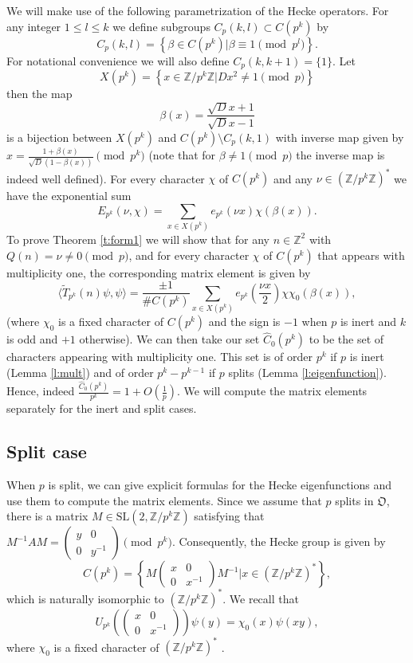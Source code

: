 \documentclass[12pt]{amsart}
\theoremstyle{definition}
\theoremstyle{remark}
\numberwithin{equation}{section}
\newcommand{\set}[1]{\left\{#1\right\}}
\newcommand{\T}[1]{\tilde{T}_{#1}}
\newcommand{\frakO}{\mathfrak{O}}
\newcommand{\bbZ}{\mathbb{Z}}
\newcommand{\SL}{ \mathrm{SL}}
\begin{document}
We will make use of the following parametrization of the Hecke
operators. For any integer $1\leq l\leq k$ we define subgroups
$C_p(k,l)\subset C(p^k)$ by
\[C_p(k,l)=\set{\beta\in C(p^k)|\beta\equiv 1\pmod {p^l}}.\]
For notational convenience we will also define $C_p(k,k+1)=\{1\}$.
Let $$X(p^k)=\set{x\in\bbZ/p^k\bbZ|Dx^2\neq 1\pmod{p}}$$ then the
map
\begin{equation}\label{e:beta}
\beta(x)=\frac{\sqrt{D}x+1}{\sqrt{D}x-1}
\end{equation}
 is a bijection between $X(p^k)$ and $C(p^k)\setminus C_p(k,1)$ with inverse map given by $x=\frac{1+\beta(x)}{\sqrt{D}(1-\beta(x))}\pmod{p^k}$ (note that for $\beta\neq 1\pmod{p}$ the inverse map is indeed well defined).
For every character $\chi$ of $C(p^k)$ and any $\nu\in
(\bbZ/p^k\bbZ)^*$ we have the exponential sum
\[E_{p^k}(\nu,\chi)=\sum_{x\in X(p^k)}e_{p^k}(\nu x)\chi(\beta(x)).\]
To prove Theorem \ref{t:form1} we will show that for any
$n\in\bbZ^2$ with $Q(n)=\nu\neq 0\pmod{p}$, and for every character
$\chi$ of $C(p^k)$ that appears with multiplicity one, the
corresponding matrix element is given by
 \[\langle \T{p^k}(n)\psi,\psi\rangle=\frac{\pm 1}{\# C(p^k)}\sum_{x\in X(p^k)}e_{p^k}(\frac{\nu x}{2})\chi\chi_0(\beta(x)),\]
(where $\chi_0$ is a fixed character of $C(p^k)$ and the sign is
$-1$ when $p$ is inert and $k$ is odd and $+1$ otherwise). We can
then take our set $\hat{C}_0(p^k)$ to be the set of characters
appearing with multiplicity one. This set is of order $p^k$ if $p$
is inert (Lemma \ref{l:mult}) and of order $p^{k}-p^{k-1}$ if $p$
splits (Lemma \ref{l:eigenfunction}). Hence,
 indeed $\frac{\hat{C}_0(p^k)}{p^k}=1+O(\frac{1}{p})$.
We will compute the matrix elements separately for the inert and
split cases.


\subsection{Split case}
When $p$ is split, we can give explicit formulas for the Hecke
eigenfunctions and use them to compute the matrix elements. Since we
assume that $p$ splits in $\frakO$, there is a matrix
$M\in\SL(2,\bbZ/p^k\bbZ)$ satisfying that $M^{-1}AM=\begin{pmatrix}
y & 0\\ 0 & y^{-1}\end{pmatrix}\pmod{p^k}$. Consequently, the Hecke
group is given by
$$C(p^k)=\set{M\begin{pmatrix}x & 0\\ 0 & x^{-1}\end{pmatrix}M^{-1}| x\in(\bbZ/p^k\bbZ)^*},$$ which is naturally isomorphic to $(\bbZ/p^k\bbZ)^*$. We recall that
\begin{equation}\label{eq:diag}
U_{p^k}(\begin{pmatrix} x & 0\\ 0 &
x^{-1}\end{pmatrix})\psi(y)=\chi_0(x)\psi(xy),
\end{equation}
where $\chi_0$ is a fixed character of $(\bbZ/p^k\bbZ)^*$
\cite[Section 4.3]{KurRud2000}.
\end{document}
